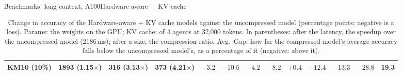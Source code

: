 \documentclass[aspectratio=169,10pt]{beamer}
\begin{document}
\begin{frame}{Benchmarks: long context, A100}{Hardware-aware + KV cache}
\begin{table}
\begin{adjustbox}{width=\linewidth, totalheight=0.64\textheight, keepaspectratio, center}
{\begin{tabular}{lcccccccccccc}
KM10 (10\%) & 1893 (1.15$\times$) & 316 (3.13$\times$) & 373 (4.21$\times$) & $-3.2$ & $-10.6$ & $-4.2$ & $-8.2$ & $+0.4$ & $-12.4$ & $-13.3$ & $-28.8$ & 19.3 \\
\bottomrule
\end{tabular}}
\end{adjustbox}
\caption{Change in accuracy of the Hardware-aware + KV cache models against the uncompressed model (percentage points; negative is a loss). Params: the weights on the GPU; KV cache: of 4 agents at 32{,}000 tokens. In parentheses: after the latency, the speedup over the uncompressed model (2186\,ms); after a size, the compression ratio. Avg.\ Gap: how far the compressed model's average accuracy falls below the uncompressed model's, as a percentage of it (negative: above it).}\label{tab:kvdelta}
\end{table}
\end{frame}
\end{document}
